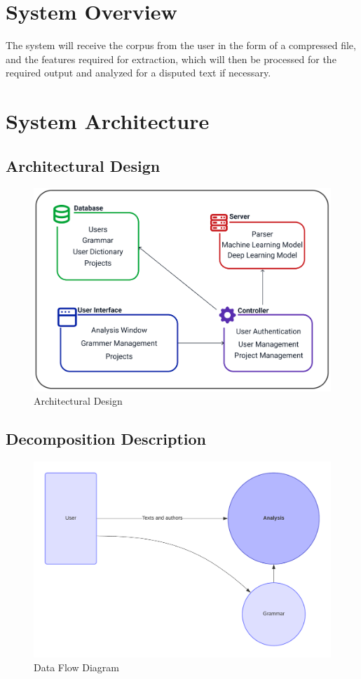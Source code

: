 \section{System Overview}
The system will receive the corpus from the user in the form of a compressed file, and the features required for extraction, which will then be processed for the required output and analyzed for a disputed text if necessary.

\section{System Architecture}

\subsection{Architectural Design}
\begin{figure}[tbh]
    \centering
    \includegraphics[width=0.7\linewidth]{images/System Overview.png}
    \caption{Architectural Design}
    \label{fig:image}
\end{figure}


\subsection{Decomposition Description}
\begin{figure}[H]
    \includegraphics[width=15cm]{images/DFD.png}
    \caption{Data Flow Diagram}
\end{figure}

